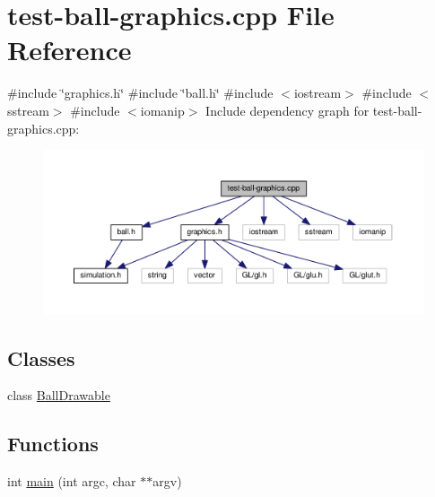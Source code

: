 \hypertarget{test-ball-graphics_8cpp}{}\section{test-\/ball-\/graphics.cpp File Reference}
\label{test-ball-graphics_8cpp}
{\ttfamily \#include \char`\"{}graphics.\+h\char`\"{}}\newline
{\ttfamily \#include \char`\"{}ball.\+h\char`\"{}}\newline
{\ttfamily \#include $<$iostream$>$}\newline
{\ttfamily \#include $<$sstream$>$}\newline
{\ttfamily \#include $<$iomanip$>$}\newline
Include dependency graph for test-\/ball-\/graphics.cpp\+:
\nopagebreak
\begin{figure}[H]
\begin{center}
\leavevmode
\includegraphics[width=350pt]{test-ball-graphics_8cpp__incl}
\end{center}
\end{figure}
\subsection*{Classes}
\begin{DoxyCompactItemize}
\item 
class \hyperlink{classBallDrawable}{Ball\+Drawable}
\end{DoxyCompactItemize}
\subsection*{Functions}
\begin{DoxyCompactItemize}
\item 
int \hyperlink{test-ball-graphics_8cpp_a3c04138a5bfe5d72780bb7e82a18e627}{main} (int argc, char $\ast$$\ast$argv)
\end{DoxyCompactItemize}


